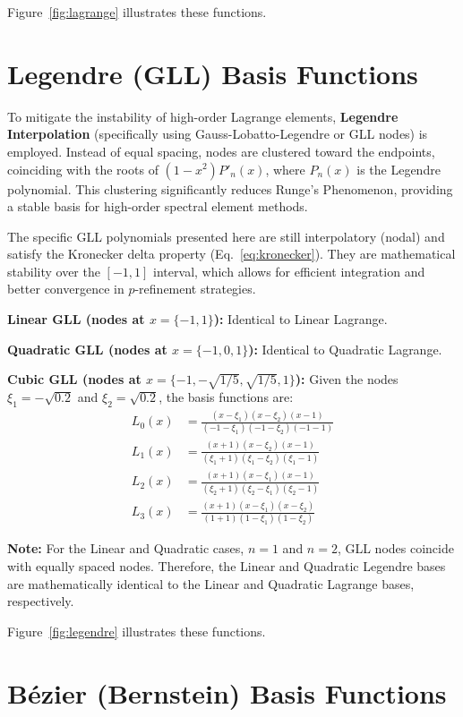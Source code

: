 \documentclass[12pt,report,justified]{SANDreport}
\begin{document}
Figure~{\ref{fig:lagrange}} illustrates these functions.

\section{Legendre (GLL) Basis Functions}

To mitigate the instability of high-order Lagrange elements, {\bf Legendre Interpolation} (specifically using Gauss-Lobatto-Legendre or GLL nodes) is employed. Instead of equal spacing, nodes are clustered toward the endpoints, coinciding with the roots of $(1-x^2)P'_n(x)$, where $P_n(x)$ is the Legendre polynomial. This clustering significantly reduces Runge's Phenomenon, providing a stable basis for high-order spectral element methods.

The specific GLL polynomials presented here are still interpolatory (nodal) and satisfy the Kronecker delta property (Eq.~\ref{eq:kronecker}).   They are mathematical stability over the $[-1, 1]$ interval, which allows for efficient integration and better convergence in $p$-refinement strategies.

{\bf Linear GLL (nodes at $x = \{-1, 1\}$):}
Identical to Linear Lagrange.

{\bf Quadratic GLL (nodes at $x = \{-1, 0, 1\}$):}
Identical to Quadratic Lagrange.

{\bf Cubic GLL (nodes at $x = \{-1, -\sqrt{1/5}, \sqrt{1/5}, 1\}$):}
Given the nodes $\xi_1 = -\sqrt{0.2}$ and $\xi_2 = \sqrt{0.2}$, the basis functions are:
\begin{align}
L_0(x) &= \frac{(x - \xi_1)(x - \xi_2)(x - 1)}{(-1 - \xi_1)(-1 - \xi_2)(-1 - 1)} \\
L_1(x) &= \frac{(x + 1)(x - \xi_2)(x - 1)}{(\xi_1 + 1)(\xi_1 - \xi_2)(\xi_1 - 1)} \\
L_2(x) &= \frac{(x + 1)(x - \xi_1)(x - 1)}{(\xi_2 + 1)(\xi_2 - \xi_1)(\xi_2 - 1)} \\
L_3(x) &= \frac{(x + 1)(x - \xi_1)(x - \xi_2)}{(1 + 1)(1 - \xi_1)(1 - \xi_2)}
\end{align}

{\bf Note:} For the Linear and Quadratic cases, $n=1$ and $n=2$, GLL nodes coincide with equally spaced nodes. Therefore, the Linear and Quadratic Legendre bases are mathematically identical to the Linear and Quadratic Lagrange bases, respectively.

Figure~{\ref{fig:legendre}} illustrates these functions.

\section{B{\'e}zier (Bernstein) Basis Functions}
\end{document}
